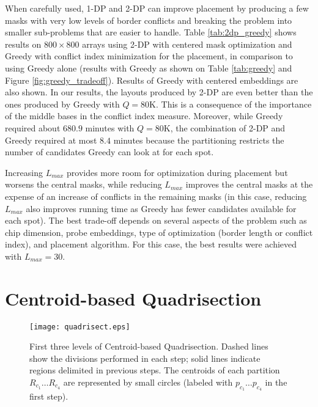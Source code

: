 
When carefully used, 1-DP and 2-DP can improve placement by producing a few
masks with very low levels of border conflicts and breaking the problem into
smaller sub-problems that are easier to handle. Table \ref{tab:2dp_greedy} shows
results on $800\times 800$ arrays using 2-DP with centered mask optimization and
Greedy with conflict index minimization for the placement, in comparison to
using Greedy alone (results with Greedy as shown on Table \ref{tab:greedy} and
Figure \ref{fig:greedy_tradeoff}). Results of Greedy with centered embeddings
are also shown. In our results, the layouts produced by 2-DP are even better
than the ones produced by Greedy with $Q=80$K. This is a consequence of the
importance of the middle bases in the conflict index measure. Moreover, while
Greedy required about $680.9$ minutes with $Q=80$K, the combination of 2-DP and
Greedy required at most $8.4$ minutes because the partitioning restricts the
number of candidates Greedy can look at for each spot.

Increasing $L_{max}$ provides more room for optimization during placement but
worsens the central masks, while reducing $L_{max}$ improves the central masks
at the expense of an increase of conflicts in the remaining masks (in this case,
reducing $L_{max}$ also improves running time as Greedy has fewer candidates
available for each spot). The best trade-off depends on several aspects of the
problem such as chip dimension, probe embeddings, type of optimization (border
length or conflict index), and placement algorithm. For this case, the best
results were achieved with $L_{max}=30$.

\section{Centroid-based Quadrisection}
\label{sec:part_cq}

\begin{figure}\centering
\texttt{[image: quadrisect.eps]}
\caption{\label{fig:quadrisect}%
  First three levels of Centroid-based Quadrisection. Dashed lines show the
  divisions performed in each step; solid lines indicate regions delimited in
  previous steps. The centroids of each partition $R_{c_1} \dots R_{c_4}$ are
  represented by small circles (labeled with $p_{c_1} \dots p_{c_4}$ in the
  first step).}
\end{figure}

